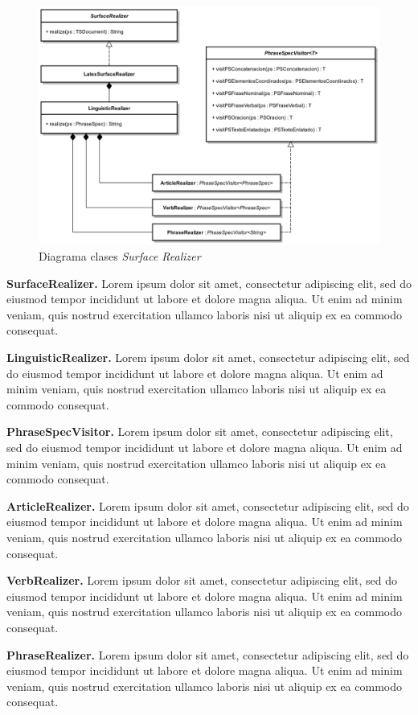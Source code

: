 \begin{figure}[H]
  	\centering
	\includegraphics[scale=0.17]{img/realizer_imp.png}
	\caption{Diagrama clases \textit{Surface Realizer}}
  	\label{fig:imp_surfrealizer}
\end{figure}

\bigskip
\noindent
\textbf{SurfaceRealizer.} Lorem ipsum dolor sit amet, consectetur adipiscing elit, sed do eiusmod tempor incididunt ut labore et dolore magna aliqua. Ut enim ad minim veniam, quis nostrud exercitation ullamco laboris nisi ut aliquip ex ea commodo consequat.

\bigskip
\noindent
\textbf{LinguisticRealizer.} Lorem ipsum dolor sit amet, consectetur adipiscing elit, sed do eiusmod tempor incididunt ut labore et dolore magna aliqua. Ut enim ad minim veniam, quis nostrud exercitation ullamco laboris nisi ut aliquip ex ea commodo consequat.

\bigskip
\noindent
\textbf{PhraseSpecVisitor.} Lorem ipsum dolor sit amet, consectetur adipiscing elit, sed do eiusmod tempor incididunt ut labore et dolore magna aliqua. Ut enim ad minim veniam, quis nostrud exercitation ullamco laboris nisi ut aliquip ex ea commodo consequat.

\bigskip
\noindent
\textbf{ArticleRealizer.} Lorem ipsum dolor sit amet, consectetur adipiscing elit, sed do eiusmod tempor incididunt ut labore et dolore magna aliqua. Ut enim ad minim veniam, quis nostrud exercitation ullamco laboris nisi ut aliquip ex ea commodo consequat.

\bigskip
\noindent
\textbf{VerbRealizer.} Lorem ipsum dolor sit amet, consectetur adipiscing elit, sed do eiusmod tempor incididunt ut labore et dolore magna aliqua. Ut enim ad minim veniam, quis nostrud exercitation ullamco laboris nisi ut aliquip ex ea commodo consequat.

\bigskip
\noindent
\textbf{PhraseRealizer.} Lorem ipsum dolor sit amet, consectetur adipiscing elit, sed do eiusmod tempor incididunt ut labore et dolore magna aliqua. Ut enim ad minim veniam, quis nostrud exercitation ullamco laboris nisi ut aliquip ex ea commodo consequat.